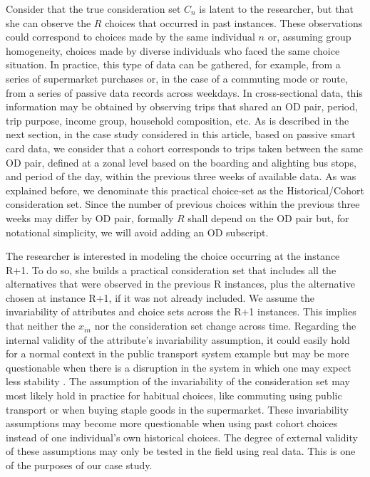 \documentclass[12pt,a4paper]{article}
\begin{document}
Consider that the true consideration set $C_{n}$ is latent to the researcher, but that she can observe the $R$ choices that occurred in past instances. These observations could correspond to choices made by the same individual $n$ or, assuming group homogeneity, choices made by diverse individuals who faced the same choice situation. In practice, this type of data can be gathered, for example, from a series of supermarket purchases or, in the case of a commuting mode or route, from a series of passive data records across weekdays. In cross-sectional data, this information may be obtained by observing trips that shared an OD pair, period, trip purpose, income group, household composition, etc. As is described in the next section, in the case study considered in this article, based on passive smart card data, we consider that a cohort corresponds to trips taken between the same OD pair, defined at a zonal level based on the boarding and alighting bus stops, and period of the day, within the previous three weeks of available data. As was explained before, we denominate this practical choice-set as the Historical/Cohort consideration set. Since the number of previous choices within the previous three weeks may differ by OD pair, formally $R$ shall depend on the OD pair but, for notational simplicity, we will avoid adding an OD subscript. 

The researcher is interested in modeling the choice occurring at the instance R+1. To do so, she builds a practical consideration set that includes all the alternatives that were observed in the previous R instances, plus the alternative chosen at instance R+1, if it was not already included. We assume the invariability of attributes and choice sets across the R+1 instances. This implies that neither the $x_{in}$ nor the consideration set change across time. Regarding the internal validity of the attribute’s invariability assumption, it could easily hold for a normal context in the public transport system example but may be more questionable when there is a disruption in the system in which one may expect less stability \citep{yap2017robust, malandri2018recovery}. The assumption of the invariability of the consideration set may most likely hold in practice for habitual choices, like commuting using public transport or when buying staple goods in the supermarket. These invariability assumptions may become more questionable when using past cohort choices instead of one individual’s own historical choices. The degree of external validity of these assumptions may only be tested in the field using real data. This is one of the purposes of our case study.
\end{document}
